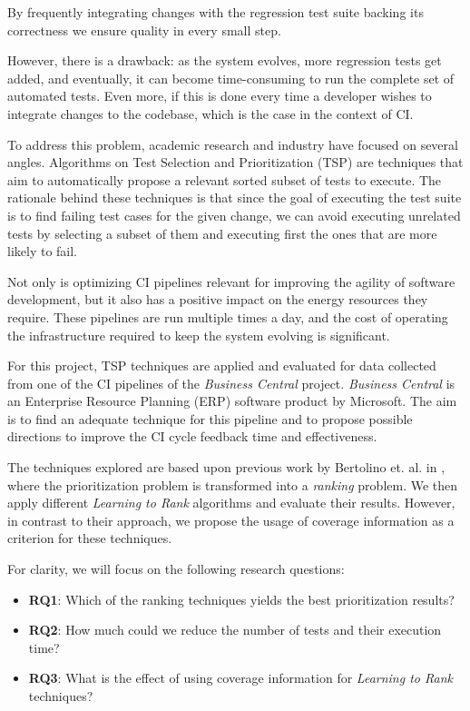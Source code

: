 By frequently integrating changes with the regression test suite backing its correctness
we ensure quality in every small step.

However, there is a drawback: as the system evolves, more regression tests
get added, and eventually, it can become time-consuming to run the complete
set of automated tests. Even more, if this is done every time a developer wishes to
integrate changes to the codebase, which is the case in the context of CI.

To address this problem, academic research and industry have focused on several angles.
Algorithms on Test Selection and Prioritization (TSP) are techniques that aim to 
automatically propose a relevant sorted subset of tests to execute. The rationale
behind these techniques is that since the goal of executing the test suite is to
find failing test cases for the given change, we can avoid executing unrelated tests
by selecting a subset of them and executing first the ones that are more likely to fail.

Not only is optimizing CI pipelines relevant for improving the agility of software development, 
but it also has a positive impact on the energy resources they require.
These pipelines are run multiple times a day, and the cost of operating the infrastructure
required to keep the system evolving is significant.

For this project, TSP techniques are applied and evaluated for data collected from one of the CI pipelines
of the \emph{Business Central} project. \emph{Business Central} is an Enterprise Resource Planning (ERP)
software product by Microsoft.  The aim is to find an adequate technique for this pipeline and to 
propose possible directions to improve the CI cycle feedback time and effectiveness.

The techniques explored are based upon previous work by Bertolino
et. al. in \cite{Bertolino2020LearningtoRankVR}, where the prioritization problem is transformed
into a \emph{ranking} problem. We then apply different \emph{Learning to Rank} algorithms and evaluate
their results. However, in contrast to their approach, we propose the usage of coverage information 
as a criterion for these techniques.

For clarity, we will focus on the following research questions:
\begin{itemize}
    \item \textbf{RQ1}: Which of the ranking techniques yields the best prioritization results?
    \item \textbf{RQ2}: How much could we reduce the number of tests and their execution time?
    \item \textbf{RQ3}: What is the effect of using coverage information for \emph{Learning to Rank} techniques?
\end{itemize}

